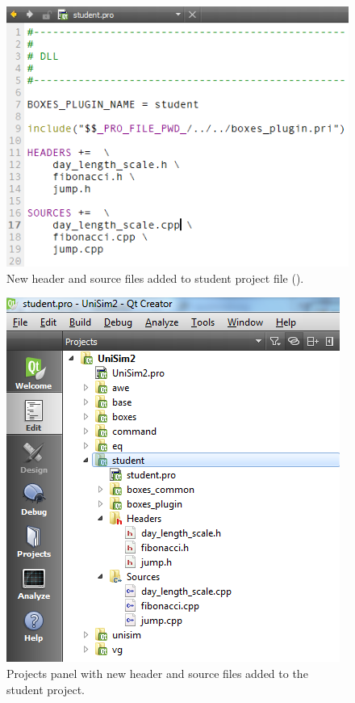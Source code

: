 \begin{figure}
\centering
\includegraphics[scale=0.7]{graphics/qt-creator-project-file-2}
\caption{New header and source files added to student project file ().}
\label{fig:qt-creator-project-file-2}
\end{figure}

\begin{figure}
\centering
\includegraphics[scale=0.7]{graphics/qt-creator-projects-student-2}
\caption{Projects panel with new header and source files added to the student project.}
\label{fig:qt-creator-projects-student-2}
\end{figure}

